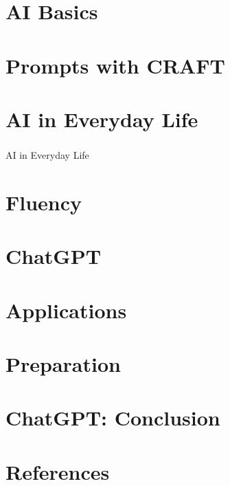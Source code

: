 
\section[Core]{AI Basics}



\section[Prompts]{Prompts with CRAFT}


\section[Everyday]{AI in Everyday Life}
\begin{frame}[fragile]\frametitle{}
\begin{center}
{\Large AI in Everyday Life}
\end{center}
\end{frame}


\section[fluency]{Fluency}


\section[ChatGPT]{ChatGPT}


\section[Apps]{Applications}


% 

\section[Prep]{Preparation}


\section[ChatGPTConcl]{ChatGPT: Conclusion}


\section[Refs]{References}

